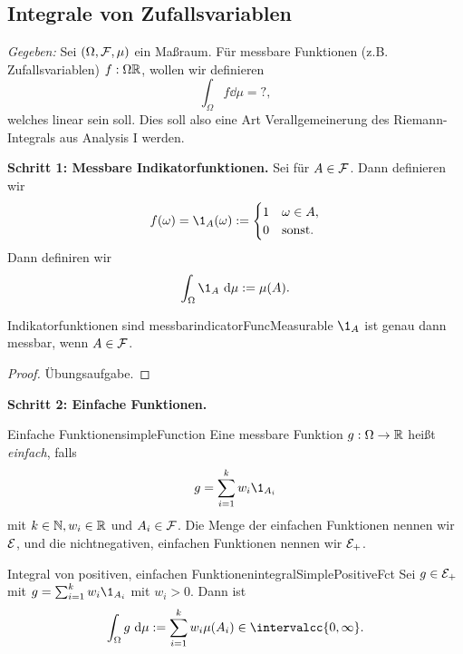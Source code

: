 \documentclass[language=ngerman]{../../Template/TemplateLecture}
\begin{document}
\subsection{Integrale von Zufallsvariablen}

\emph{Gegeben:} Sei $(\Omega, \mathcal{F}, \mu)$ ein Maßraum. Für messbare Funktionen (z.B. Zufallsvariablen) $f: \Omega \mathbb{R}$, wollen wir definieren
\begin{equation}
    \int_\Omega f \dd\mu = ?,
\end{equation}
welches linear sein soll. Dies soll also eine Art Verallgemeinerung des Riemann-Integrals aus Analysis I werden.

\textbf{Schritt 1: Messbare Indikatorfunktionen.} Sei für $A \in \mathcal{F}$. Dann definieren wir 
\begin{equation}
    f(\omega) = \1_A(\omega) := \begin{cases}
        1 & \omega \in A, \\
        0 & \text{sonst}.
    \end{cases}
\end{equation}
Dann definiren wir 
\begin{equation}
    \int_\Omega \1_A \dd\mu := \mu(A).
\end{equation}
\begin{lem}{Indikatorfunktionen sind messbar}{indicatorFuncMeasurable}
    $\1_A$ ist genau dann messbar, wenn $A \in \mathcal{F}$.
\end{lem}
\begin{proof}
    Übungsaufgabe.
\end{proof}

\textbf{Schritt 2: Einfache Funktionen.} 
\begin{defi}{Einfache Funktionen}{simpleFunction}
    Eine messbare Funktion $g: \Omega \to \mathbb{R}$  heißt \emph{einfach}, falls 
    \begin{equation}
        g = \sum_{i = 1}^k w_i \1_{A_i}
    \end{equation}
    mit $k \in \mathbb{N}, w_i \in \mathbb{R}$ und $A_i \in \mathcal{F}$. Die Menge der einfachen Funktionen nennen wir $\mathcal{E}$, und die nichtnegativen, einfachen Funktionen nennen wir $\mathcal{E}_+$.
\end{defi}

\begin{defi}{Integral von positiven, einfachen Funktionen}{integralSimplePositiveFct}
    Sei $g \in \mathcal{E}_+$ mit $g = \sum_{i = 1}^k w_i \1_{A_i}$ mit $w_i > 0$. Dann ist 
    \begin{equation}
        \int_\Omega g \dd\mu := \sum_{i = 1}^k w_i \mu(A_i) \in \intervalcc{0,\infty}.
    \end{equation}
\end{defi}
\end{document}
